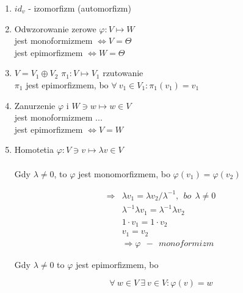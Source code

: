 \documentclass[a5paper,8pt]{article}
\newcommand\tab[1][1cm]{\hspace*{#1}}
\begin{document}
    \begin{enumerate}[label=\textbf{\arabic*})]
        \item
            $ id_v $ - izomorfizm (automorfizm)
        \item
            Odwzorowanie zerowe $ \varphi: V \longmapsto W $ \\
            \tab jest monoformizmem $ \Longleftrightarrow V = {\Theta} $\\
            \tab jest epimorfizmem $ \Longleftrightarrow W = {\Theta} $
        \item
            $V = V_1 \oplus V_2 $ \tab
            $\pi_1: V \longmapsto V_1 $ rzutowanie\\
            $\pi_1$ jest epimorfizmem, bo $ \forall~ v_1 \in V_1 : \pi_1(v_1) = v_1 $
        \item
            Zanurzenie $\varphi$ i $ W \ni w \longmapsto w \in V $\\
            \tab jest monoformizmem ...\\
            \tab jest epimorfizmem $ \Longleftrightarrow V = W $
        \item
            Homotetia $ \varphi: V \ni v \longmapsto \lambda v \in V $\\\\
            Gdy $ \lambda \neq 0 $, to $ \varphi $ jest monomorfizmem, bo
            $ \varphi(v_1) = \varphi(v_2) $

            \begin{equation*}
                \begin{aligned}
                    \Longrightarrow & \lambda v_1 = \lambda v_2
                    \bigg/ \lambda^{-1}, ~~bo~~ \lambda \neq 0 \\
                    & \lambda^{-1} \lambda v_1 = \lambda^{-1} \lambda v_2\\
                    & 1 \cdot v_1 = 1 \cdot v_2\\
                    & v_1 = v_2 \\
                    & \Longrightarrow \varphi ~~-~~monoformizm
                \end{aligned}
            \end{equation*}

            Gdy $\lambda \neq 0 $ to $\varphi$ jest epimorfizmem, bo

            \begin{equation*}
                \forall ~w \in V ~\exists~v \in V: \varphi(v) = w
            \end{equation*}


\end{enumerate}
\end{document}
